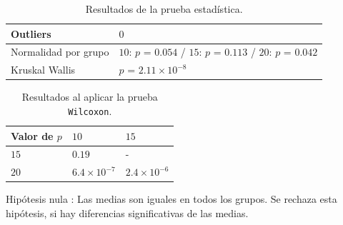 \documentclass{article}
\begin{document}
\begin{table}[h!]
\centering
\caption{Resultados de la prueba estadística.}
\smallskip

\begin{tabular}{ |p{4cm}|p{8cm}|}
 \hline
 Outliers & $0$ \\
 \hline
 Normalidad por grupo & $10$: $p$ = $0.054$ / $15$: $p$ = $0.113$ / $20$: $p$ = $0.042$ \\
 \hline
 Kruskal Wallis & $p$ = $2.11\times 10^{-8}$ \\
 \hline
\end{tabular}
\label{Cuadro9}
\end{table}

\begin{table}[h!]
\centering
\caption{Resultados al aplicar la prueba \texttt{Wilcoxon}.}
\smallskip

\begin{tabular}{|p{1.7cm}|p{1.7cm}|p{1.7cm}|}
 \hline
Valor de $p$ & $10$ & $15$ \\
 \hline
 $15$ & $0.19$ & -   \\
 \hline
 $20$ & $6.4\times 10^{-7}$ & $2.4\times 10^{-6}$  \\
 \hline
\end{tabular}
\label{Cuadro10}
\end{table}

Hipótesis nula : Las medias son iguales en todos los grupos. Se rechaza esta hipótesis, si hay diferencias significativas de las medias.
\end{document}
